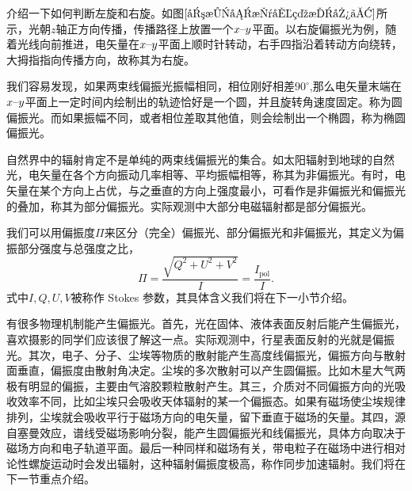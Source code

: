 \documentclass[../天体物理基础.tex]{subfiles}
\begin{document}
介绍一下如何判断左旋和右旋。如图$\ref{右旋偏振光示意图。}$所示，光朝$z$轴正方向传播，传播路径上放置一个$x\text{\textendash}y$平面。以右旋偏振光为例，随着光线向前推进，电矢量在$x\text{\textendash}y$平面上顺时针转动，右手四指沿着转动方向绕转，大拇指指向传播方向，故称其为右旋。

我们容易发现，如果两束线偏振光振幅相同，相位刚好相差$90^{\circ}$,那么电矢量末端在$x\text{\textendash}y$平面上一定时间内绘制出的轨迹恰好是一个圆，并且旋转角速度固定。称为圆偏振光。而如果振幅不同，或者相位差取其他值，则会绘制出一个椭圆，称为椭圆偏振光。

自然界中的辐射肯定不是单纯的两束线偏振光的集合。如太阳辐射到地球的自然光，电矢量在各个方向振动几率相等、平均振幅相等，称其为非偏振光。有时，电矢量在某个方向上占优，与之垂直的方向上强度最小，可看作是非偏振光和偏振光的叠加，称其为部分偏振光。实际观测中大部分电磁辐射都是部分偏振光。

我们可以用偏振度$\Pi$来区分（完全）偏振光、部分偏振光和非偏振光，其定义为偏振部分强度与总强度之比，
\begin{equation}
\Pi=\dfrac{\sqrt{Q^2+U^2+V^2}}I=\frac{I_{\text{pol}}}{I}.
\end{equation}
式中$I,Q,U,V$被称作 Stokes 参数，其具体含义我们将在下一小节介绍。

有很多物理机制能产生偏振光。首先，光在固体、液体表面反射后能产生偏振光，喜欢摄影的同学们应该很了解这一点。实际观测中，行星表面反射的光就是偏振光。其次，电子、分子、尘埃等物质的散射能产生高度线偏振光，偏振方向与散射面垂直，偏振度由散射角决定。尘埃的多次散射可以产生圆偏振。比如木星大气两极有明显的偏振，主要由气溶胶颗粒散射产生。其三，介质对不同偏振方向的光吸收效率不同，比如尘埃只会吸收天体辐射的某一个偏振态。如果有磁场使尘埃规律排列，尘埃就会吸收平行于磁场方向的电矢量，留下垂直于磁场的矢量。其四，源自塞曼效应，谱线受磁场影响分裂，能产生圆偏振光和线偏振光，具体方向取决于磁场方向和电子轨道平面。最后一种同样和磁场有关，带电粒子在磁场中进行相对论性螺旋运动时会发出辐射，这种辐射偏振度极高，称作同步加速辐射。我们将在下一节重点介绍。
\end{document}
